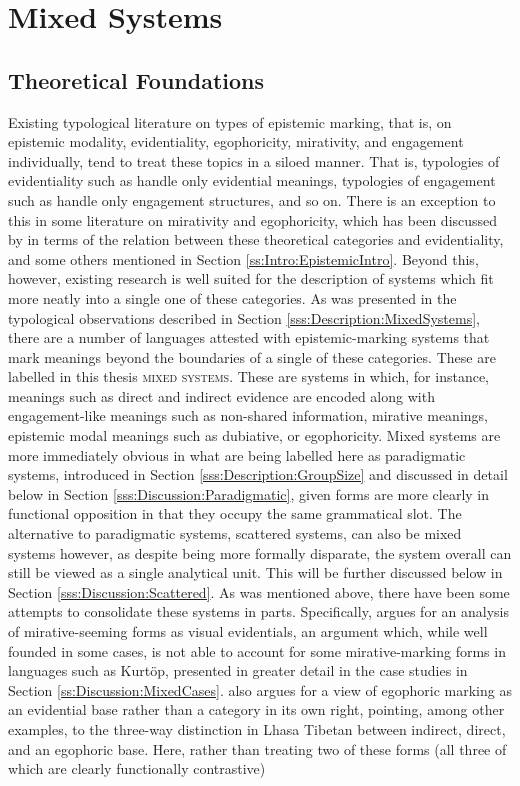 \section{Mixed Systems}\label{s:Discussion:Mixed}
\subsection{Theoretical Foundations}\label{ss:Discussion:MixedFoundation}
Existing typological literature on types of epistemic marking, that is, on epistemic modality, evidentiality, egophoricity, mirativity, and engagement individually, tend to treat these topics in a siloed manner. That is, typologies of evidentiality such as  handle only evidential meanings, typologies of engagement such as  handle only engagement structures, and so on. There is an exception to this in some literature on mirativity and egophoricity, which has been discussed by  in terms of the relation between these theoretical categories and evidentiality, and some others mentioned in Section \ref{ss:Intro:EpistemicIntro}. Beyond this, however, existing research is well suited for the description of systems which fit more neatly into a single one of these categories. As was presented in the typological observations described in Section \ref{sss:Description:MixedSystems}, there are a number of languages attested with epistemic-marking systems that mark meanings beyond the boundaries of a single of these categories. These are labelled in this thesis \textsc{mixed systems}. These are systems in which, for instance, meanings such as direct and indirect evidence are encoded along with engagement-like meanings such as non-shared information, mirative meanings, epistemic modal meanings such as dubiative, or egophoricity. Mixed systems are more immediately obvious in what are being labelled here as paradigmatic systems, introduced in Section \ref{sss:Description:GroupSize} and discussed in detail below in Section \ref{sss:Discussion:Paradigmatic}, given forms are more clearly in functional opposition in that they occupy the same grammatical slot. The alternative to paradigmatic systems, scattered systems, can also be mixed systems however, as despite being more formally disparate, the system overall can still be viewed as a single analytical unit. This will be further discussed below in Section \ref{sss:Discussion:Scattered}. As was mentioned above, there have been some attempts to consolidate these systems in parts. Specifically,  argues for an analysis of mirative-seeming forms as visual evidentials, an argument which, while well founded in some cases, is not able to account for some mirative-marking forms in languages such as Kurtöp, presented in greater detail in the case studies in Section \ref{ss:Discussion:MixedCases}.  also argues for a view of egophoric marking as an evidential base rather than a category in its own right, pointing, among other examples, to the three-way distinction in Lhasa Tibetan between indirect, direct, and an egophoric base. Here, rather than treating two of these forms (all three of which are clearly functionally contrastive) 